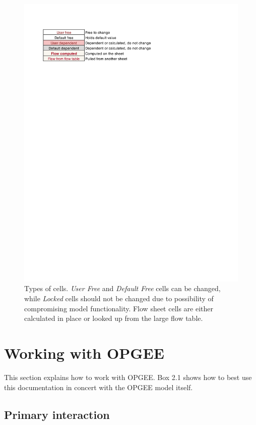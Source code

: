 \documentclass[11pt]{report}
\begin{document}
\begin{figure}[t]
\includegraphics[width=0.8\columnwidth]{images/CellTypes.pdf}
\caption{Types of cells. \emph{User Free} and \emph{Default Free} cells can be changed, while \emph{Locked} cells should not be changed due to possibility of compromising model functionality. Flow sheet cells are either calculated in place or looked up from the large flow table.}
\label{fig:Cell_types_SS}
\end{figure}


\clearpage

\section{Working with OPGEE}

This section explains how to work with OPGEE. Box 2.1 shows how to best use this documentation in concert with the OPGEE model itself.

\subsection{Primary interaction}\label{sec:primary_interaction}
\end{document}
